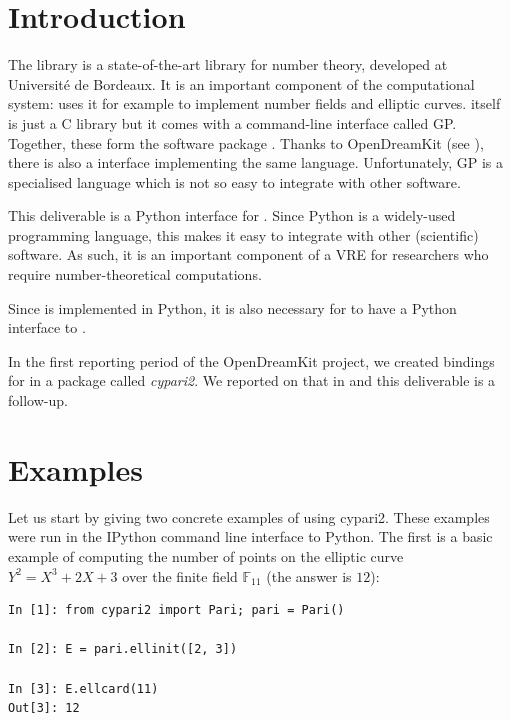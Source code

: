 \documentclass{deliverablereport}
\author{Vincent Delecroix, Jeroen Demeyer, Vincent Klein}
\begin{document}
\maketitle
\tableofcontents


\section{Introduction}

The \Pari library is a state-of-the-art library for number theory,
developed at Universit\'e de Bordeaux.
It is an important component of the \Sage computational system:
\Sage uses it for example to implement number fields and elliptic curves.
\Pari itself is just a C library but it comes with a command-line interface called GP.
Together, these form the software package \PariGP.
Thanks to OpenDreamKit (see ),
there is also a \Jupyter interface implementing the same language.
Unfortunately, GP is a specialised language which is not so easy
to integrate with other software.

This deliverable is a Python interface for \PariGP.
Since Python is a widely-used programming language,
this makes it easy to integrate \PariGP with other (scientific) software.
As such, it is an important component of a VRE
for researchers who require number-theoretical computations.

Since \Sage is implemented in Python,
it is also necessary for \Sage to have a Python interface to \PariGP.

In the first reporting period of the OpenDreamKit project,
we created \Python bindings for \PariGP in a package called \emph{cypari2}.
We reported on that in  and this deliverable is a follow-up.

\clearpage
\section{Examples}

Let us start by giving two concrete examples of using cypari2.
These examples were run in the IPython command line interface to Python.
The first is a basic example of computing
the number of points on the elliptic curve $Y^2 = X^3 + 2X + 3$
over the finite field $\mathbb{F}_{11}$ (the answer is $12$):
\begin{verbatim}
In [1]: from cypari2 import Pari; pari = Pari()

In [2]: E = pari.ellinit([2, 3])

In [3]: E.ellcard(11)
Out[3]: 12
\end{verbatim}
\end{document}
